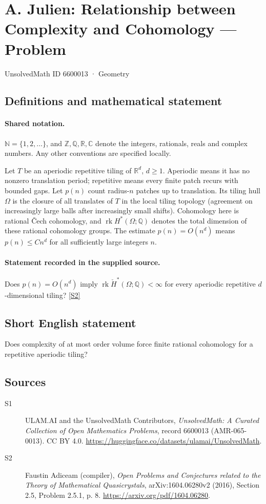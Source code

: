 \documentclass[11pt]{article}
\newcommand{\sref}[2]{\hyperlink{source:#1:#2}{[S#2]}}
\begin{document}
\setcounter{section}{6600012}
\section{A. Julien: Relationship between Complexity and Cohomology — Problem}\label{6600013}
{\small\sffamily UnsolvedMath ID 6600013 · Geometry}
\subsection{Definitions and mathematical statement}

\paragraph{Shared notation.}$\mathbb N=\{1,2,\ldots\}$, and $\mathbb Z,\mathbb Q,\mathbb R,\mathbb C$ denote the integers, rationals, reals and complex numbers. Any other conventions are specified locally.


Let $T$ be an aperiodic repetitive tiling of $\mathbb R^d$, $d\geq1$. Aperiodic means it has no nonzero translation period; repetitive means every finite patch recurs with bounded gaps. Let $p(n)$ count radius-$n$ patches up to translation. Its tiling hull $\Omega$ is the closure of all translates of $T$ in the local tiling topology (agreement on increasingly large balls after increasingly small shifts). Cohomology here is rational Čech cohomology, and $\operatorname{rk}H^*(\Omega;\mathbb Q)$ denotes the total dimension of these rational cohomology groups. The estimate $p(n)=O(n^d)$ means $p(n)\leq Cn^d$ for all sufficiently large integers $n$.
\paragraph{Statement recorded in the supplied source.}
Does $p(n)=O(n^d)$ imply $\operatorname{rk}\check H^*(\Omega;\mathbb Q)<\infty$ for every aperiodic repetitive $d$-dimensional tiling? \sref{6600013}{2}
\subsection{Short English statement}
Does complexity of at most order volume force finite rational cohomology for a repetitive aperiodic tiling?
\subsection{Sources}
\begin{description}
\item[\hypertarget{source:6600013:1}{S1}] ULAM.AI and the UnsolvedMath Contributors, \emph{UnsolvedMath: A Curated Collection of Open Mathematics Problems}, record 6600013 (AMR-065-0013). CC BY 4.0. \url{https://huggingface.co/datasets/ulamai/UnsolvedMath}.
\item[\hypertarget{source:6600013:2}{S2}] Faustin Adiceam (compiler), \emph{Open Problems and Conjectures related to the Theory of Mathematical Quasicrystals}, arXiv:1604.06280v2 (2016), Section 2.5, Problem 2.5.1, p. 8. \url{https://arxiv.org/pdf/1604.06280}.
\end{description}
\label{end:6600013}
\end{document}
